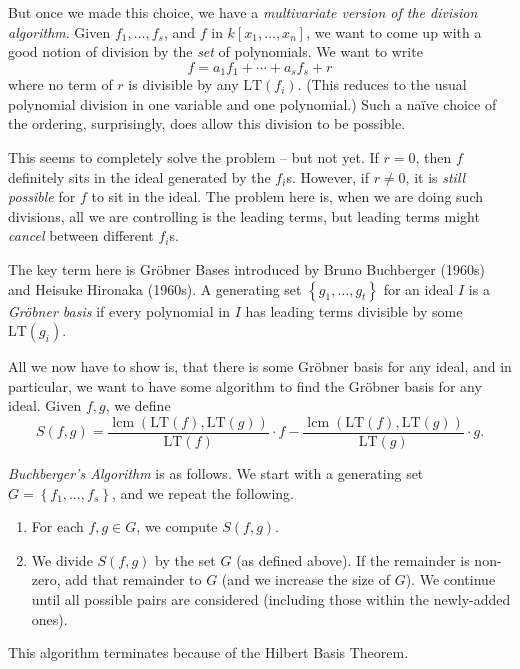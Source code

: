 \documentclass{article}
\theoremstyle{definition}
\theoremstyle{remark}
\newcommand{\pqty}[1]{\left(#1\right)}
\newcommand{\bqty}[1]{\left[#1\right]}
\newcommand{\Bqty}[1]{\left\{#1\right\}}
\newcommand{\lcm}{\operatorname{lcm}}
\begin{document}
But once we made this choice, we have a \emph{multivariate version of the division algorithm}. Given \(f_1, \ldots, f_s\), and \(f\) in \(k\bqty{x_1, \ldots, x_n}\), we want to come up with a good notion of division by the \emph{set} of polynomials. We want to write
\[
    f = a_1 f_1 + \cdots + a_s f_s + r
\]
where no term of \(r\) is divisible by any \(\text{LT} \pqty{f_i}\). (This reduces to the usual polynomial division in one variable and one polynomial.) Such a na\"{i}ve choice of the ordering, surprisingly, does allow this division to be possible.

This seems to completely solve the problem -- but not yet. If \(r = 0\), then \(f\) definitely sits in the ideal generated by the \(f_i\)s. However, if \(r \neq 0\), it is \emph{still possible} for \(f\) to sit in the ideal. The problem here is, when we are doing such divisions, all we are controlling is the leading terms, but leading terms might \emph{cancel} between different \(f_i\)s.

The key term here is Gr\"{o}bner Bases introduced by Bruno Buchberger (1960s) and Heisuke Hironaka (1960s). A generating set \(\Bqty{g_1, \ldots, g_t}\) for an ideal \(I\) is a \emph{Gr\"{o}bner basis} if every polynomial in \(I\) has leading terms divisible by some \(\text{LT}\pqty{g_i}\).

All we now have to show is, that there is some Gr\"{o}bner basis for any ideal, and in particular, we want to have some algorithm to find the Gr\"{o}bner basis for any ideal. Given \(f, g\), we define
\[
    S\pqty{f, g} = \frac{\lcm \pqty{\text{LT} \pqty{f}, \text{LT} \pqty{g}}}{\text{LT} \pqty{f}} \cdot f - \frac{\lcm \pqty{\text{LT} \pqty{f}, \text{LT} \pqty{g}}}{\text{LT} \pqty{g}} \cdot g.
\]

\emph{Buchberger's Algorithm} is as follows. We start with a generating set \(G = \Bqty{f_1, \ldots, f_s}\), and we repeat the following.

\begin{enumerate}
    \item For each \(f, g \in G\), we compute \(S\pqty{f, g}\).
    \item We divide \(S\pqty{f, g}\) by the set \(G\) (as defined above). If the remainder is non-zero, add that remainder to \(G\) (and we increase the size of \(G\)). We continue until all possible pairs are considered (including those within the newly-added ones).
\end{enumerate}

This algorithm terminates because of the Hilbert Basis Theorem.
\end{document}
